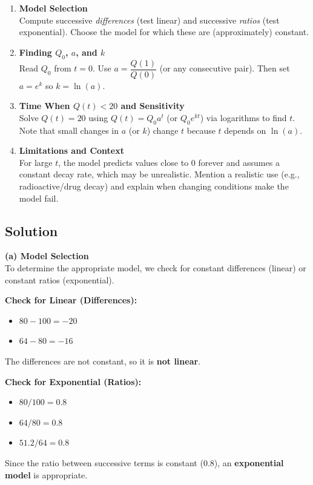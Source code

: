 \begin{enumerate}[label=(\alph*)]

    \item \textbf{Model Selection} \\
    Compute successive \emph{differences} (test linear) and successive \emph{ratios} (test exponential).  
    Choose the model for which these are (approximately) constant.

    \item \textbf{Finding $Q_0$, $a$, and $k$} \\
    Read $Q_0$ from $t=0$.  
    Use $a = \dfrac{Q(1)}{Q(0)}$ (or any consecutive pair).  
    Then set $a = e^{k}$ so $k = \ln(a)$.

    \item \textbf{Time When $Q(t) < 20$ and Sensitivity} \\
    Solve $Q(t)=20$ using $Q(t)=Q_0 a^{t}$ (or $Q_0 e^{kt}$) via logarithms to find $t$.  
    Note that small changes in $a$ (or $k$) change $t$ because $t$ depends on $\ln(a)$.

    \item \textbf{Limitations and Context} \\
    For large $t$, the model predicts values close to $0$ forever and assumes a constant decay rate, which may be unrealistic.  
    Mention a realistic use (e.g., radioactive/drug decay) and explain when changing conditions make the model fail.

\end{enumerate}

\subsection*{Solution}
\textbf{(a) Model Selection} \\
    To determine the appropriate model, we check for constant differences (linear) or constant ratios (exponential).
    
    \textbf{Check for Linear (Differences):}
    \begin{itemize}
        \item $80 - 100 = -20$
        \item $64 - 80 = -16$
    \end{itemize}
    The differences are not constant, so it is \textbf{not linear}.
    
    \textbf{Check for Exponential (Ratios):}
    \begin{itemize}
        \item $80 / 100 = 0.8$
        \item $64 / 80 = 0.8$
        \item $51.2 / 64 = 0.8$
    \end{itemize}
    Since the ratio between successive terms is constant ($0.8$), an \textbf{exponential model} is appropriate.

